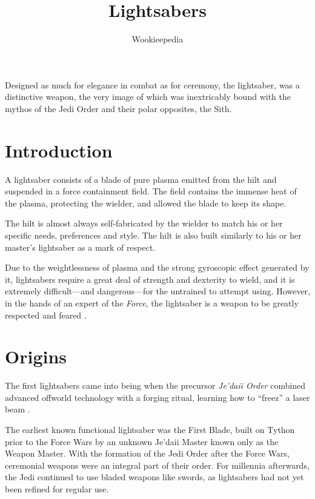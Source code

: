 \documentclass[11pt]{article}
\title{Lightsabers}
\author{
  Wookieepedia
}
\begin{document}
\maketitle

\abstract
Designed as much for elegance in combat as for ceremony, the lightsaber,
was a distinctive weapon, the very image of which was inextricably bound 
with the mythos of the Jedi Order and their polar opposites, the Sith.



\section{Introduction}

\noindent
A lightsaber consists of a blade of pure plasma emitted from the hilt and 
suspended in a force containment field. The field contains the immense heat of 
the plasma, protecting the wielder, and allowed the blade to keep its shape. 

The hilt is almost always self-fabricated by the wielder to match his or her 
specific needs, preferences and style. The hilt is also built similarly to his 
or her master's lightsaber as a mark of respect. 

Due to the weightlessness of plasma and the strong gyroscopic effect generated 
by it, lightsabers require a great deal of strength and dexterity to wield, 
and it is extremely difficult---and dangerous---for the untrained to attempt 
using. However, in the hands of an expert of the \textit{Force}, the lightsaber 
is a weapon to be greatly respected and feared \cite{wikia}.


\section{Origins}

\noindent
The first lightsabers came into being when the precursor \textit{Je'daii Order} 
combined advanced offworld technology with a forging ritual, learning how to 
``freez'' a laser beam \cite{WallaceAnderson2005}.

The earliest known functional lightsaber was the First Blade, built on Tython 
prior to the Force Wars by an unknown Je'daii Master known only as the Weapon 
Master. With the formation of the Jedi Order after the Force Wars, ceremonial 
weapons were an integral part of their order. For millennia afterwards, the Jedi 
continued to use bladed weapons like swords, as lightsabers had not yet been 
refined for regular use.




\end{document}
